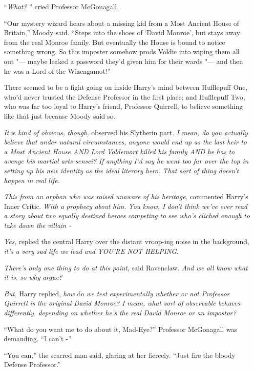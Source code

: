 ``\emph{What?} '' cried Professor McGonagall.

``Our mystery wizard hears about a missing kid from a Most Ancient House
of Britain,'' Moody said. ``Steps into the shoes of `David Monroe', but
stays away from the real Monroe family. But eventually the House is
bound to notice something wrong. So this imposter somehow prods Voldie
into wiping them all out "--- maybe leaked a password they'd given him for
their wards "--- and then he was a Lord of the Wizengamot!''

There seemed to be a fight going on inside Harry's mind between
Hufflepuff One, who'd never trusted the Defense Professor in the first
place; and Hufflepuff Two, who was far too loyal to Harry's friend,
Professor Quirrell, to believe something like that just because Moody
said so.

\emph{It} is \emph{kind of obvious, though,} observed his Slytherin
part. \emph{I mean, do you actually believe that under natural
circumstances, anyone would end up as the last heir to a Most Ancient
House AND Lord Voldemort killed his family AND he has to avenge his
martial arts sensei? If anything I'd say he went too far over the top in
setting up his new identity as the ideal literary hero. That sort of
thing doesn't happen in real life.}

\emph{This from an orphan who was raised unaware of his heritage,}
commented Harry's Inner Critic. \emph{With a prophecy about him. You
know, I don't think we've ever read a story about two equally destined
heroes competing to see who's cliched enough to take down the villain -}

\emph{Yes,} replied the central Harry over the distant vroop-ing noise
in the background, \emph{it's a very sad life we lead and YOU'RE NOT
HELPING.}

\emph{There's only one thing to do at this point,} said Ravenclaw.
\emph{And we all know what it is, so why argue?}

\emph{But,} Harry replied, \emph{how} do \emph{we test experimentally
whether or not Professor Quirrell is the original David Monroe? I mean,
what sort of observable behaves differently, depending on whether he's
the real David Monroe or an impostor?}

``What do you want me to do about it, Mad-Eye?'' Professor McGonagall
was demanding. ``I can't -''

``You can,'' the scarred man said, glaring at her fiercely. ``Just fire
the bloody Defense Professor.''

